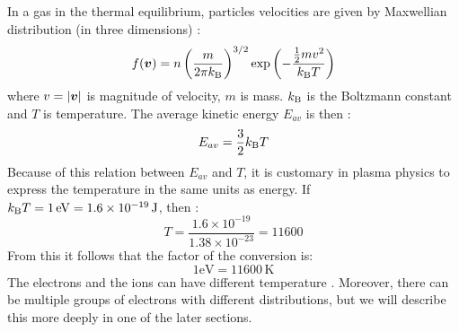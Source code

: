 In a gas in the thermal equilibrium, particles velocities are given by Maxwellian distribution (in three dimensions) \cite{plasma-intro3}:
\begin{equation}
	f(\bm{v}) = n\left(\frac{m}{2\pi k_\mathrm{B}}\right)^{3/2}\exp\left(-\frac{\frac{1}{2}m v^2}{k_\mathrm{B} T}\right)
\end{equation} 
\noindent where $v = \lvert \bm{v} \rvert$ is magnitude of velocity, $m$ is mass. $k_\mathrm{B}$ is the Boltzmann constant and $T$ is temperature. The average kinetic energy $E_{av}$ is then \cite{plasma-intro3}:
\begin{equation}
	E_{av}=\frac{3}{2}k_\mathrm{B} T
\end{equation}
Because of this relation between $E_{av}$ and $T$, it is customary in plasma physics to express the temperature in the same units as energy. If $k_\mathrm{B} T = 1 \, \mathrm{eV} = 1.6 \times 10^{-19}\, \mathrm{J}$, then \cite{plasma-intro3}:
\begin{equation}
	T = \frac{1.6 \times 10^{-19}}{1.38\times 10^{-23}}=11600
\end{equation}
\noindent From this it follows that the factor of the conversion is:
\begin{equation}
	1 \mathrm{eV} = 11600\,\mathrm{K}
\end{equation} 
The electrons and the ions can have different temperature \cite{plasma-intro3}. Moreover, there can be multiple groups of electrons with different distributions, but we will describe this more deeply in one of the later sections.

